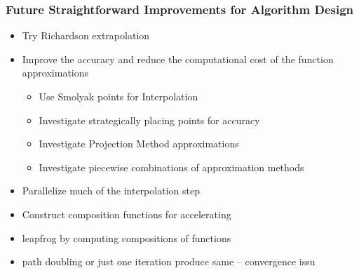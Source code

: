 \documentclass{beamer}
\begin{document}
  \begin{frame}
    \frametitle{Future Straightforward Improvements for Algorithm Design}
    \begin{itemize}
     \item Try Richardson extrapolation
\item Improve the accuracy and reduce the computational cost of the function approximations
      \begin{itemize}
\item  Use Smolyak points for Interpolation
\item Investigate strategically placing points for accuracy
\item  Investigate Projection Method approximations
\item Investigate piecewise combinations of approximation methods
      \end{itemize}
\item Parallelize much of the interpolation step
\item Construct composition functions for accelerating
 \item leapfrog by computing compositions of functions
     \item path doubling or just one iteration produce same  -- convergence  issu


\end{itemize}
\end{frame}
\end{document}
